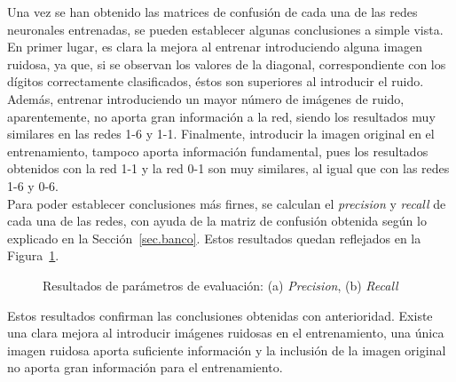 Una vez se han obtenido las matrices de confusión de cada una de las redes neuronales entrenadas, se pueden establecer algunas conclusiones a simple vista. En primer lugar, es clara la mejora al entrenar introduciendo alguna imagen ruidosa, ya que, si se observan los valores de la diagonal, correspondiente con los dígitos correctamente clasificados, éstos son superiores al introducir el ruido. Además, entrenar introduciendo un mayor número de imágenes de ruido, aparentemente, no aporta gran información a la red, siendo los resultados muy similares en las redes 1-6 y 1-1. Finalmente, introducir la imagen original en el entrenamiento, tampoco aporta información fundamental, pues los resultados obtenidos con la red 1-1 y la red 0-1 son muy similares, al igual que con las redes 1-6 y 0-6.\\

Para poder establecer conclusiones más firnes, se calculan el \textit{precision} y \textit{recall} de cada una de las redes, con ayuda de la matriz de confusión obtenida según lo explicado en la Sección~\ref{sec.banco}. Estos resultados quedan reflejados en la Figura~\ref{fig.precision-recall}.
\begin{figure}[H]
	\centering
	\caption{Resultados de parámetros de evaluación: (a) \textit{Precision}, (b) \textit{Recall}}
		\label{fig.precision-recall}
\end{figure}
Estos resultados confirman las conclusiones obtenidas con anterioridad. Existe una clara mejora al introducir imágenes ruidosas en el entrenamiento, una única imagen ruidosa aporta suficiente información y la inclusión de la imagen original no aporta gran información para el entrenamiento.\\

